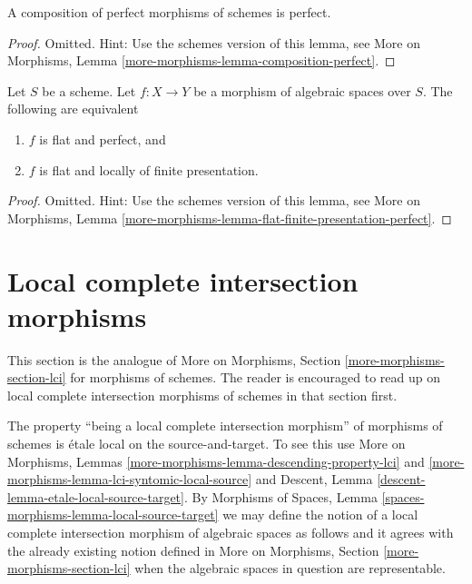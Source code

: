 \begin{lemma}
\label{lemma-composition-perfect}
A composition of perfect morphisms of schemes is perfect.
\end{lemma}

\begin{proof}
Omitted. Hint: Use the schemes version of this lemma, see
More on Morphisms,
Lemma \ref{more-morphisms-lemma-composition-perfect}.
\end{proof}

\begin{lemma}
\label{lemma-flat-finite-presentation-perfect}
Let $S$ be a scheme. Let $f : X \to Y$ be a morphism of algebraic spaces over
$S$. The following are equivalent
\begin{enumerate}
\item $f$ is flat and perfect, and
\item $f$ is flat and locally of finite presentation.
\end{enumerate}
\end{lemma}

\begin{proof}
Omitted. Hint: Use the schemes version of this lemma, see
More on Morphisms,
Lemma \ref{more-morphisms-lemma-flat-finite-presentation-perfect}.
\end{proof}









\section{Local complete intersection morphisms}
\label{section-lci}

\noindent
This section is the analogue of
More on Morphisms, Section \ref{more-morphisms-section-lci}
for morphisms of schemes. The reader is encouraged to read up
on local complete intersection morphisms of schemes in that section first.

\medskip\noindent
The property ``being a local complete intersection morphism'' of morphisms
of schemes is \'etale local on the source-and-target. To see this use
More on Morphisms,
Lemmas \ref{more-morphisms-lemma-descending-property-lci} and
\ref{more-morphisms-lemma-lci-syntomic-local-source}
and
Descent, Lemma \ref{descent-lemma-etale-local-source-target}.
By
Morphisms of Spaces,
Lemma \ref{spaces-morphisms-lemma-local-source-target}
we may define the notion of a local complete intersection morphism
of algebraic spaces as follows and it agrees with the already existing
notion defined in
More on Morphisms, Section \ref{more-morphisms-section-lci}
when the algebraic spaces in question are representable.

